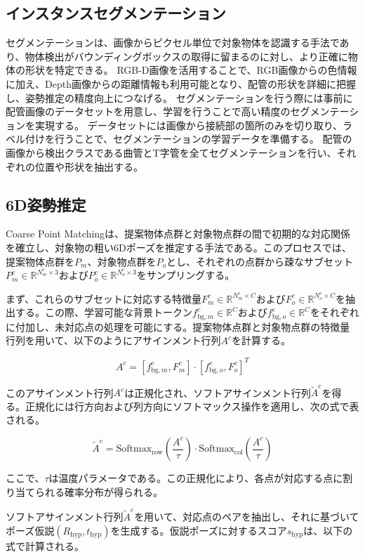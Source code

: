 \subsection{インスタンスセグメンテーション}


セグメンテーションは、画像からピクセル単位で対象物体を認識する手法であり、物体検出がバウンディングボックスの取得に留まるのに対し、より正確に物体の形状を特定できる。
RGB-D画像を活用することで、RGB画像からの色情報に加え、Depth画像からの距離情報も利用可能となり、配管の形状を詳細に把握し、姿勢推定の精度向上につなげる。
セグメンテーションを行う際には事前に配管画像のデータセットを用意し、学習を行うことで高い精度のセグメンテーションを実現する。
データセットには画像から接続部の箇所のみを切り取り、ラベル付けを行うことで、セグメンテーションの学習データを準備する。
配管の画像から検出クラスである曲管とT字管を全てセグメンテーションを行い、それぞれの位置や形状を抽出する。

\subsection{6D姿勢推定}
Coarse Point Matchingは、提案物体点群と対象物点群の間で初期的な対応関係を確立し、対象物の粗い6Dポーズを推定する手法である。このプロセスでは、提案物体点群を$P_m$、対象物点群を$P_o$とし、それぞれの点群から疎なサブセット$P_m^c \in \mathbb{R}^{N_m^c \times 3}$および$P_o^c \in \mathbb{R}^{N_o^c \times 3}$をサンプリングする。

まず、これらのサブセットに対応する特徴量$F_m^c \in \mathbb{R}^{N_m^c \times C}$および$F_o^c \in \mathbb{R}^{N_o^c \times C}$を抽出する。この際、学習可能な背景トークン$f_{\text{bg}, m}^c \in \mathbb{R}^C$および$f_{\text{bg}, o}^c \in \mathbb{R}^C$をそれぞれに付加し、未対応点の処理を可能にする。提案物体点群と対象物点群の特徴量行列を用いて、以下のようにアサインメント行列$A^c$を計算する。

\[
A^c = [f_{\text{bg}, m}^c, F_m^c] \cdot [f_{\text{bg}, o}^c, F_o^c]^T
\]

このアサインメント行列$A^c$は正規化され、ソフトアサインメント行列$\tilde{A}^c$を得る。正規化には行方向および列方向にソフトマックス操作を適用し、次の式で表される。

\[
\tilde{A}^c = \text{Softmax}_{\text{row}}\left(\frac{A^c}{\tau}\right) \cdot \text{Softmax}_{\text{col}}\left(\frac{A^c}{\tau}\right)
\]

ここで、$\tau$は温度パラメータである。この正規化により、各点が対応する点に割り当てられる確率分布が得られる。

ソフトアサインメント行列$\tilde{A}^c$を用いて、対応点のペアを抽出し、それに基づいてポーズ仮説$(R_{\text{hyp}}, t_{\text{hyp}})$を生成する。仮説ポーズに対するスコア$s_{\text{hyp}}$は、以下の式で計算される。

